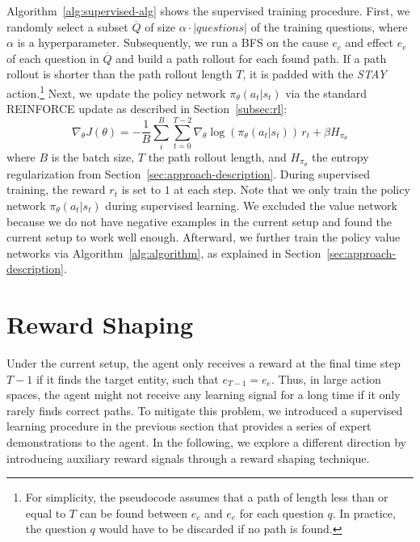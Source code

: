 
Algorithm~\ref{alg:supervised-alg} shows the supervised training procedure.
First, we randomly select a subset $\overline{Q}$ of size $\alpha \cdot |questions|$
 of the training questions, where $\alpha$ is a hyperparameter.
Subsequently, we run a BFS on the cause $e_c$ and effect $e_e$ of each question in $\overline{Q}$
and build a path rollout for each found path. If a path rollout is shorter than
the path rollout length $T$, it is padded with the \textit{STAY} action.\footnote{For simplicity, the pseudocode assumes that a path of length less than or equal to $T$ can 
			 be found between $e_c$ and $e_e$ for each question $q$. In practice, the question $q$
			 would have to be discarded if no path is found.} Next, we 
update the policy network $\pi_{\theta}(a_t | s_t)$ via the standard REINFORCE update as described
in Section~\ref{subsec:rl}:
\begin{equation}
  \nabla_{\theta} J(\theta) = - \frac{1}{B} \sum_{i}^{B} \sum_{t=0}^{T-2} \nabla_{\theta} \log(\pi_{\theta} (a_t | s_t)) \, r_t + \beta H_{\pi_\theta}
\end{equation}
where $B$ is the batch size, $T$ the path rollout length, and $H_{\pi_\theta}$ the entropy regularization from Section~\ref{sec:approach-description}. 
During supervised training, the reward $r_t$ is set to $1$ at each step.
Note that we only train the policy network $\pi_{\theta}(a_t | s_t)$ during supervised 
learning. We excluded the value network because we do not have negative examples in the current setup and found the current 
setup to work well enough.
Afterward, we further train the policy value networks via Algorithm~\ref{alg:algorithm}, as explained in Section~\ref{sec:approach-description}.


\section{Reward Shaping}
\label{sec:reward-shaping}

Under the current setup, the agent only receives a reward at the final time step $T-1$ if it 
finds the target entity, such that $e_{T-1} = e_e$.
Thus, in large action spaces, the agent might not receive any 
learning signal for a long time if it only rarely finds correct paths. 
To mitigate this problem, we introduced a supervised learning 
procedure in the previous section that provides a series of expert demonstrations to the agent.
In the following, we explore a different direction by introducing auxiliary reward signals through a 
reward shaping technique.

